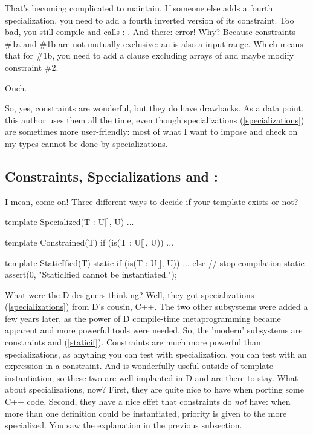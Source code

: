 That's becoming complicated to maintain. If someone else adds a fourth specialization, you need to add a fourth inverted version of its constraint. Too bad, you still compile and calls : \DD{[])}. And there: error! Why? Because constraints \#1a and \#1b are not mutually exclusive: an \DD{[]} is also a input range. Which means that for \#1b, you need to add a clause excluding arrays of  and maybe modify constraint \#2.

Ouch. 

So, yes, constraints are wonderful, but they do have drawbacks. As a data point, this author uses them all the time, even though specializations (\ref{specializations}) are sometimes more user-friendly: most of what I want to impose and check on my types cannot be done by specializations. 

\subsection{Constraints, Specializations and :}
\label{constraintsorspecializations}

I mean, come on! Three different ways to decide if your template exists or not? 

\begin{dcode}
template Specialized(T : U[], U)
{ ... }

template Constrained(T) if (is(T : U[], U))
{ ... }

template StaticIfied(T)
{
    static if (is(T : U[], U))
    { ... }
    else // stop compilation
        static assert(0, "StaticIfied cannot be instantiated.");
}
\end{dcode}

What were the D designers thinking? Well, they got specializations (\ref{specializations}) from D's cousin, C++. The two other subsystems were added a few years later, as the power of D compile-time metaprogramming became apparent and more powerful tools were needed. So, the 'modern' subsystems are constraints and  (\ref{staticif}). Constraints are much more powerful than specializations, as anything you can test with specialization, you can test with an  expression in a constraint. And  is wonderfully useful outside of template instantiation, so these two are well implanted in D and are there to stay.
What about specializations, now? First, they are quite nice to have when porting some C++ code. Second, they have a nice effet that constraints do \emph{not} have: when more than one definition could be instantiated, priority is given to the more specialized. You saw the explanation in the previous subsection.

